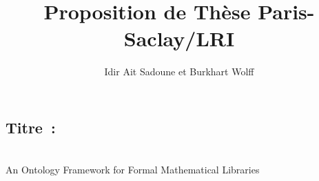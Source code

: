\documentclass[a4paper,10pt]{article}
\begin{document}
\title{\textbf{Proposition de Thèse Paris-Saclay/LRI}}
\author{Idir Ait Sadoune et Burkhart Wolff}
\date{}

\maketitle

\subsection*{Titre~:}
\begin{center}
\large  \\
  An Ontology Framework for Formal Mathematical Libraries 
\end{center}


\end{document}
